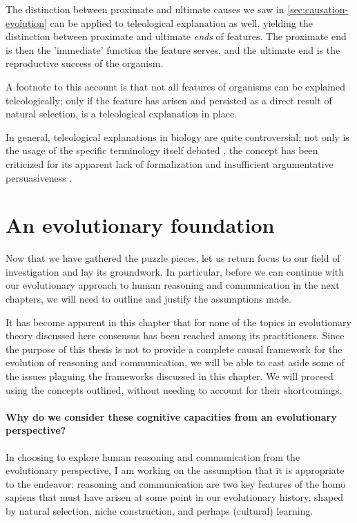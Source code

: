 The distinction between proximate and ultimate causes we saw in \cref{sec:causation-evolution} can be applied to teleological explanation as well, yielding the distinction between proximate and ultimate \emph{ends} of features. The proximate end is then the 'immediate' function the feature serves, and the ultimate end is the reproductive success of the organism.

A footnote to this account is that not all features of organisms can be explained teleologically; only if the feature has arisen and persisted as a direct result of natural selection, is a teleological explanation in place.

In general, teleological explanations in biology are quite controversial: not only is the usage of the specific terminology itself debated \citep[p.~27 and references therein]{Ayala99}, the concept has been criticized for its apparent lack of formalization and insufficient argumentative persuasiveness \citep[p.~83]{Baedke2021}.

\section{An evolutionary foundation}

Now that we have gathered the puzzle pieces, let us return focus to our field of investigation and lay its groundwork. In particular, before we can continue with our evolutionary approach to human reasoning and communication in the next chapters, we will need to outline and justify the assumptions made.

It has become apparent in this chapter that for none of the topics in evolutionary theory discussed here consensus has been reached among its practitioners. Since the purpose of this thesis is not to provide a complete causal framework for the evolution of reasoning and communication, we will be able to cast aside some of the issues plaguing the frameworks discussed in this chapter. We will proceed using the concepts outlined, without needing to account for their shortcomings.

\paragraph{Why do we consider these cognitive capacities from an evolutionary perspective?}

In choosing to explore human reasoning and communication from the evolutionary perspective, I am working on the assumption that it is appropriate to the endeavor: reasoning and communication are two key features of the homo sapiens that must have arisen at some point in our evolutionary history, shaped by natural selection, niche construction, and perhaps (cultural) learning.

